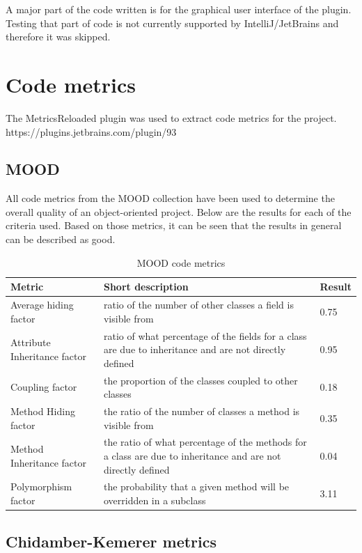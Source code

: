 \documentclass{l4proj}
\begin{document}
A major part of the code written is for the graphical user interface of the plugin. Testing that part of code is not currently supported by IntelliJ/JetBrains and therefore it was skipped. 

\section{Code metrics}

The MetricsReloaded plugin was used to extract code metrics for the project. https://plugins.jetbrains.com/plugin/93

\subsection{MOOD}

All code metrics from the MOOD collection have been used to determine the overall quality of an object-oriented project. Below are the results for each of the criteria used. Based on those metrics, it can be seen that the results in general can be described as good.

\begin{table}[H]
\small
\caption{MOOD code metrics}
\centering
\def\arraystretch{1.5}
\begin{tabular}{p{4cm}p{5cm}p{2.5cm}}
\hline
Metric & Short description & Result\\
\hline
Average hiding factor & ratio of the number of other classes a field is visible from & 0.75\\ 
Attribute Inheritance factor & ratio of what percentage of the fields for a class are due to inheritance and are not directly defined & 0.95\\
Coupling factor & the proportion of the classes coupled to other classes & 0.18\\
Method Hiding factor & the ratio of the number of classes a method is visible from & 0.35\\
Method Inheritance factor & the ratio of what percentage of the methods for a class are due to inheritance and are not directly defined & 0.04\\
Polymorphism factor & the probability that a given method will be overridden in a subclass & 3.11\\
\hline
\end{tabular}
\label{table:mood-codemetrics}
\end{table}

\subsection{Chidamber-Kemerer metrics}
\end{document}
